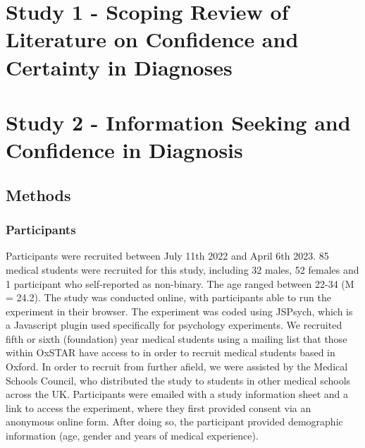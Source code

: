 \documentclass[a4paper, nobind]{templates/ociamthesis}
\begin{document}
\hypertarget{study-1---scoping-review-of-literature-on-confidence-and-certainty-in-diagnoses}{%
\chapter*{Study 1 - Scoping Review of Literature on Confidence and Certainty in Diagnoses}\label{study-1---scoping-review-of-literature-on-confidence-and-certainty-in-diagnoses}}

\adjustmtc
{}

\hypertarget{study-2---information-seeking-and-confidence-in-diagnosis}{%
\chapter*{Study 2 - Information Seeking and Confidence in Diagnosis}\label{study-2---information-seeking-and-confidence-in-diagnosis}}

\adjustmtc
{}

\hypertarget{methods}{%
\section*{Methods}\label{methods}}

\hypertarget{participants}{%
\subsection*{Participants}\label{participants}}

Participants were recruited between July 11th 2022 and April 6th 2023. 85 medical students were recruited for this study, including 32 males, 52 females and 1 participant who self-reported as non-binary. The age ranged between 22-34 (M = 24.2). The study was conducted online, with participants able to run the experiment in their browser. The experiment was coded using JSPsych, which is a Javascript plugin used specifically for psychology experiments. We recruited fifth or sixth (foundation) year medical students using a mailing list that those within OxSTAR have access to in order to recruit medical students based in Oxford. In order to recruit from further afield, we were assisted by the Medical Schools Council, who distributed the study to students in other medical schools across the UK. Participants were emailed with a study information sheet and a link to access the experiment, where they first provided consent via an anonymous online form. After doing so, the participant provided demographic information (age, gender and years of medical experience).
\end{document}
